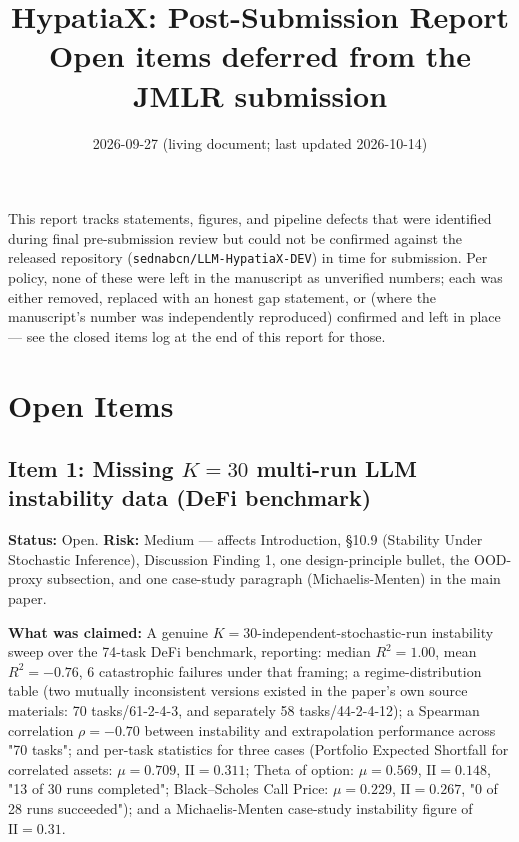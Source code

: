 \documentclass[11pt]{article}
\title{HypatiaX: Post-Submission Report\\
\large Open items deferred from the JMLR submission}
\author{}
\date{2026-09-27 (living document; last updated 2026-10-14)}
\newcommand{\Rsq}{R^{2}}
\newcommand{\II}{\mathrm{II}}
\begin{document}
\maketitle

\noindent This report tracks statements, figures, and pipeline defects that
were identified during final pre-submission review but could not be
confirmed against the released repository (\texttt{sednabcn/LLM-HypatiaX-DEV})
in time for submission. Per policy, none of these were left in the
manuscript as unverified numbers; each was either removed, replaced with an
honest gap statement, or (where the manuscript's number was independently
reproduced) confirmed and left in place — see the closed items log at the
end of this report for those.

\section{Open Items}

\subsection*{Item 1: Missing $K=30$ multi-run LLM instability data (DeFi benchmark)}
\textbf{Status:} Open. \textbf{Risk:} Medium — affects Introduction,
\S10.9 (Stability Under Stochastic Inference), Discussion
Finding 1, one design-principle bullet, the OOD-proxy subsection, and one
case-study paragraph (Michaelis-Menten) in the main paper.

\textbf{What was claimed:} A genuine $K=30$-independent-stochastic-run
instability sweep over the 74-task DeFi benchmark, reporting: median
$\Rsq=1.00$, mean $\Rsq=-0.76$, 6 catastrophic failures under that framing; a
regime-distribution table (two mutually inconsistent versions existed in the
paper's own source materials: 70 tasks/61-2-4-3, and separately 58
tasks/44-2-4-12); a Spearman correlation $\rho=-0.70$ between instability and
extrapolation performance across "70 tasks"; and per-task statistics for
three cases (Portfolio Expected Shortfall for correlated assets: $\mu=0.709$,
$\II=0.311$; Theta of option: $\mu=0.569$, $\II=0.148$, "13 of 30 runs
completed"; Black--Scholes Call Price: $\mu=0.229$, $\II=0.267$, "0 of 28
runs succeeded"); and a Michaelis-Menten case-study instability figure of
$\II=0.31$.
\end{document}
